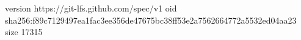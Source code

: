 version https://git-lfs.github.com/spec/v1
oid sha256:f89c7129497ea1fac3ee356de47675bc38ff53e2a7562664772a5532ed04aa23
size 17315
